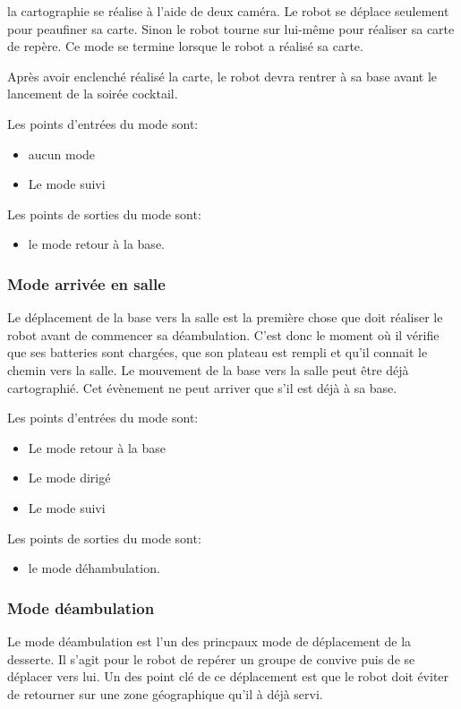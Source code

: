 la cartographie se réalise à l'aide de deux caméra. Le robot se déplace seulement pour peaufiner sa carte. Sinon le robot tourne sur lui-même pour réaliser sa carte de repère. Ce mode se termine lorsque le robot a réalisé sa carte. 

Après avoir enclenché réalisé la carte, le robot devra rentrer à sa base avant le lancement de la soirée cocktail.

Les points d'entrées du mode sont:
\begin{itemize}
\item aucun mode
\item Le mode suivi
\end{itemize}

Les points de sorties du mode sont:
\begin{itemize}
\item le mode retour à la base.
\end{itemize}

\subsubsection{Mode arrivée en salle}

Le déplacement de la base vers la salle est la première chose que doit réaliser 
le robot avant de commencer sa déambulation. C’est donc  le moment où il vérifie 
que ses batteries sont chargées, que son plateau est rempli et qu’il connait le 
chemin vers la salle. Le mouvement de la base vers la salle peut être déjà cartographié.
Cet évènement ne peut arriver que s’il est déjà à sa base.

Les points d'entrées du mode sont:
\begin{itemize}
\item Le mode retour à la base
\item Le mode dirigé
\item Le mode suivi
\end{itemize}

Les points de sorties du mode sont:
\begin{itemize}
\item le mode déhambulation.
\end{itemize}


\subsubsection{Mode déambulation}

Le mode déambulation est l'un des princpaux mode de déplacement de la
desserte. Il s'agit pour le robot de repérer un groupe de convive puis
de se déplacer vers lui. Un des point clé de ce déplacement est que le
robot doit éviter de retourner sur une zone géographique qu'il à déjà
servi.

